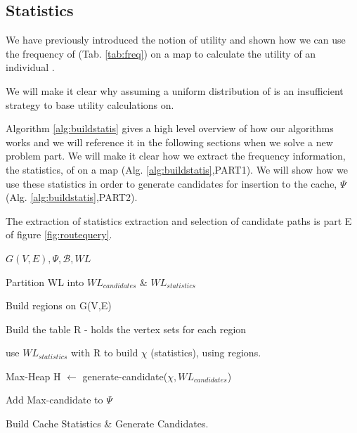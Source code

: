 



\subsection{Statistics}

We have previously introduced the notion of utility and shown how we can use the frequency of \spaths (Tab. \ref{tab:freq}) on a map to calculate the utility of an individual \spathns. 

We will make it clear why assuming a uniform distribution of \spaths is an insufficient strategy to base utility calculations on.

Algorithm \ref{alg:buildstatis} gives a high level overview of how our algorithms works and we will reference it in the following sections when we solve a new problem part.
We will make it clear how we extract the frequency information, the statistics, of \spaths on a map (Alg. \ref{alg:buildstatis},PART1). We will show how we use these statistics in order to generate \spath candidates for insertion to the cache, $\Psi$ (Alg. \ref{alg:buildstatis},PART2).

The extraction of statistics extraction and selection of candidate paths is part E of figure \ref{fig:routequery}.



\begin{algorithm} [H!bt]
\dontprintsemicolon
\SetVline


\Input
{
$G(V,E), \Psi, \mathcal{B}, WL$
}

Partition WL into $WL_{candidates}$ \& $WL_{statistics}$ \;

Build regions on G(V,E) \;

Build the table R - holds the vertex sets for each region \;

use $WL_{statistics}$ with R to build $\chi$ (statistics), using regions. \;


{
    Max-Heap H $\leftarrow$ generate-candidate($\chi, WL_{candidates}$) \;
}

{
    Add Max-candidate to $\Psi$ \;
}

\caption{Build Cache Statistics \& Generate Candidates.}
\label{alg:buildstatis}
\end{algorithm}

